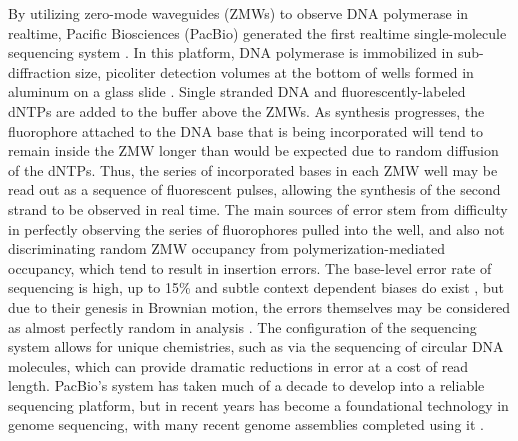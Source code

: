 By utilizing zero-mode waveguides (ZMWs) to observe DNA polymerase in realtime, Pacific Biosciences (PacBio) generated the first realtime single-molecule sequencing system \cite{eid2008real}.
In this platform, DNA polymerase is immobilized in sub-diffraction size, picoliter detection volumes at the bottom of wells formed in aluminum on a glass slide \cite{korlach2008selective}.
Single stranded DNA and fluorescently-labeled dNTPs are added to the buffer above the ZMWs.
As synthesis progresses, the fluorophore attached to the DNA base that is being incorporated will tend to remain inside the ZMW longer than would be expected due to random diffusion of the dNTPs.
Thus, the series of incorporated bases in each ZMW well may be read out as a sequence of fluorescent pulses, allowing the synthesis of the second strand to be observed in real time.
The main sources of error stem from difficulty in perfectly observing the series of fluorophores pulled into the well, and also not discriminating random ZMW occupancy from polymerization-mediated occupancy, which tend to result in insertion errors.
The base-level error rate of sequencing is high, up to 15\% and subtle context dependent biases do exist \cite{ono2012pbsim}, but due to their genesis in Brownian motion, the errors themselves may be considered as almost perfectly random in analysis \cite{ross2013characterizing,myers2014efficient}.
The configuration of the sequencing system allows for unique chemistries, such as via the sequencing of circular DNA molecules, which can provide dramatic reductions in error at a cost of read length.
PacBio's system has taken much of a decade to develop into a reliable sequencing platform, but in recent years has become a foundational technology in genome sequencing, with many recent genome assemblies completed using it \cite{rhoads2015pacbio}.

